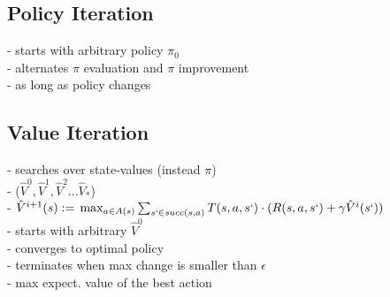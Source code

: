 \subsection*{Policy Iteration}
- starts with arbitrary policy $\pi_{0}$ \\
- alternates $\pi$ evaluation and $\pi$ improvement\\
- as long as policy changes

\subsection*{Value Iteration}
- searches over state-values (instead $\pi$)\\
- ($\hat{V}^{0}, \hat{V}^{1}, \hat{V}^{2} ... \hat{V}_{*}$) \\
- $\hat{V}^{i+1}(s):= \\
\max_{a \in A(s)} \sum_{s` \in succ(s,a)} T(s, a, s`) \cdot (R(s,a,s`) + \gamma \hat{V}^{i}(s`))$\\
- starts with arbitrary $\hat{V}^{0}$ \\
- converges to optimal policy \\
- terminates when max change is smaller than $\epsilon$ \\
- max expect. value of the best action
